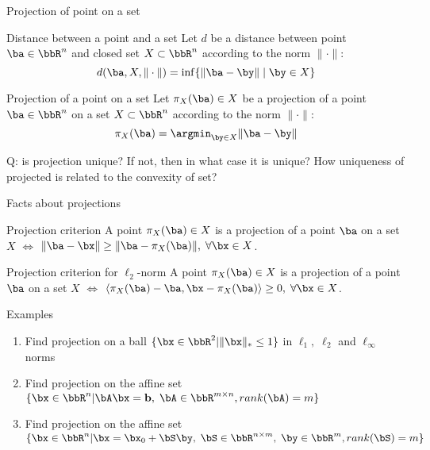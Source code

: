 \documentclass[12pt]{beamer}
\begin{document}
\begin{frame}{Projection of point on a set}
\small
\begin{block}{Distance between a point and a set}
Let $d$ be a distance between point $\ba \in \bbR^n$ and closed set $X \subset \bbR^n$ according to the norm $\| \cdot \|$:
\vspace{-4mm}
\[
d(\ba, X, \| \cdot \|) = \inf\{\| \ba - \by \| \; | \; \by \in X\}
\]
\end{block}
\begin{block}{Projection of a point on a set}
Let $\pi_X(\ba) \in X$ be a projection of a point $\ba \in \bbR^n$ on a set $X \subset \bbR^n$ according to the norm $\| \cdot \|$:
\vspace{-4mm}
\[
\pi_X(\ba) = \argmin_{\by \in X} \| \ba - \by \|
\]
\end{block}
Q: is projection unique? If not, then in what case it is unique? How uniqueness of projected is related to the convexity of set?

\end{frame}

\begin{frame}{Facts about projections}

\begin{block}{Projection criterion}
A point $\pi_X(\ba) \in X$ is a projection of a point $\ba$ on a set $X$ $\Leftrightarrow$ $\| \ba - \bx \| \geq \| \ba - \pi_X(\ba) \|, \; \forall \bx \in X$.
\end{block}

\begin{block}{Projection criterion for $\ell_2$-norm}
A point $\pi_X(\ba) \in X$ is a projection of a point $\ba$ on a set $X$ $\Leftrightarrow$ $\langle \pi_X(\ba) - \ba, \bx - \pi_X(\ba) \rangle \geq 0, \; \forall \bx \in X$.
\end{block}
\end{frame}

\begin{frame}{Examples}
\begin{enumerate}
\item Find projection on a ball $\{\bx \in \bbR^2 | \| \bx \|_* \leq 1\}$ in $\ell_1, \; \ell_2$ and $\ell_{\infty}$ norms
\item Find projection on the affine set $\{ \bx \in \bbR^n | \bA\bx = \mathbf{b}, \; \bA \in \bbR^{m \times n}, rank(\bA) = m \}$
\item Find projection on the affine set $\{ \bx \in \bbR^n | \bx = \bx_0 + \bS\by, \; \bS \in \bbR^{n \times m}, \; \by \in \bbR^m, rank(\bS) = m \}$
\end{enumerate}
\end{frame}
\end{document}
